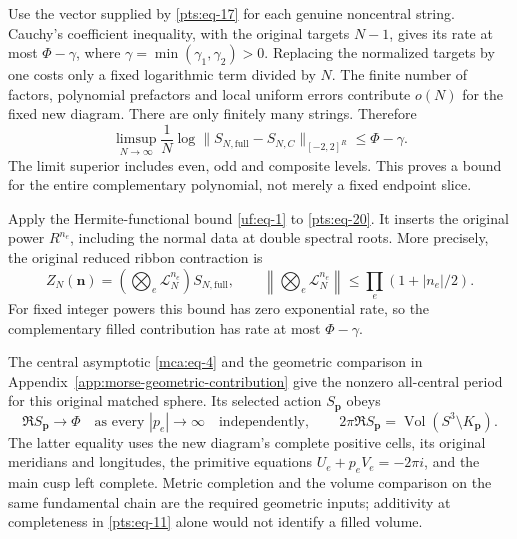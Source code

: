 Use the vector supplied by \eqref{pts:eq-17} for each genuine noncentral string.
Cauchy's coefficient inequality, with the original targets \(N-1\),
gives its rate at most \(\Phi-\gamma\), where
\(\gamma=\min(\gamma_1,\gamma_2)>0\). Replacing the normalized targets
by one costs only a fixed logarithmic term divided by \(N\). The finite
number of factors, polynomial prefactors and local uniform errors
contribute \(o(N)\) for the fixed new diagram. There are only finitely
many strings. Therefore \begin{equation}\label{pts:eq-20}
\limsup_{N\to\infty}\frac1N
 \log\|S_{N,\mathrm{full}}-S_{N,C}\|_{[-2,2]^R}
                    \le\Phi-\gamma.
\end{equation} The limit superior includes even, odd and composite levels. This
proves a bound for the entire complementary polynomial, not merely a
fixed endpoint slice.

Apply the Hermite-functional bound \eqref{uf:eq-1} to \eqref{pts:eq-20}. It inserts the original power \(R^{n_e}\), including
the normal data at double spectral roots. More precisely, the original
reduced ribbon contraction is \begin{equation}\label{pts:eq-20a}
Z_N(\boldsymbol n)=
       \left(\bigotimes_e\mathcal L_N^{n_e}\right)S_{N,\mathrm{full}},
 \qquad
 \left\|\bigotimes_e\mathcal L_N^{n_e}\right\|
       \le\prod_e(1+|n_e|/2).
\end{equation} For fixed integer powers this bound has zero exponential rate, so the
complementary filled contribution has rate at most \(\Phi-\gamma\).

The central asymptotic \eqref{mca:eq-4} and the geometric comparison
in Appendix~\ref{app:morse-geometric-contribution} give the nonzero all-central period for this
original matched sphere. Its selected action \(S_{\boldsymbol p}\) obeys
\begin{equation}\label{pts:eq-21}
\Re S_{\boldsymbol p}\longrightarrow\Phi
 \quad\text{as every }|p_e|\longrightarrow\infty
 \quad\text{independently},\qquad
 2\pi\Re S_{\boldsymbol p}
       =\operatorname{Vol}(S^3\setminus K_{\boldsymbol p}).
\end{equation} The latter equality uses the new diagram's complete positive cells,
its original meridians and longitudes, the primitive equations
\(U_e+p_eV_e=-2\pi i\), and the main cusp left complete. Metric
completion and the volume comparison on the same fundamental chain
are the required geometric inputs; additivity at completeness in
\eqref{pts:eq-11} alone would not identify a filled volume.

